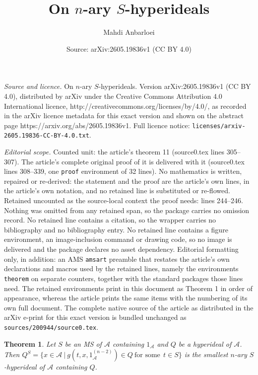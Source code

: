 \documentclass[10pt,a4paper]{amsart}
\title{On $n$-ary $S$-hyperideals}
\author{Mahdi Anbarloei}
\date{Source: arXiv:2605.19836v1 (CC BY 4.0)}
\newtheorem{theorem}{Theorem}
\begin{document}
\maketitle

\noindent\emph{Source and licence.} On $n$-ary $S$-hyperideals. Version arXiv:2605.19836v1 (CC BY 4.0), distributed by arXiv under the Creative Commons Attribution 4.0 International licence, http://creativecommons.org/licenses/by/4.0/, as recorded in the arXiv licence metadata for this exact version and shown on the abstract page https://arxiv.org/abs/2605.19836v1. Full licence notice: \texttt{licenses/arxiv-2605.19836-CC-BY-4.0.txt}.\par\smallskip

\noindent\textit{Editorial scope.} Counted unit: the article's theorem 11 (source0.tex lines 305--307). The article's complete original proof of it is delivered with it (source0.tex lines 308--339, one \texttt{proof} environment of 32 lines). No mathematics is written, repaired or re-derived: the statement and the proof are the article's own lines, in the article's own notation, and no retained line is substituted or re-flowed.  Retained uncounted as the source-local context the proof needs: lines 244--246.  Nothing was omitted from any retained span, so the package carries no omission record.  No retained line contains a citation, so the wrapper carries no bibliography and no bibliography entry.  No retained line contains a figure environment, an image-inclusion command or drawing code, so no image is delivered and the package declares no asset dependency.  Editorial formatting only, in addition: an AMS \texttt{amsart} preamble that restates the article's own declarations and macros used by the retained lines, namely the environments \texttt{theorem} on separate counters, together with the standard packages those lines need.  The retained environments print in this document as Theorem 1 in order of appearance, whereas the article prints the same items with the numbering of its own full document.  The complete native source of the article as distributed in the arXiv e-print for this exact version is bundled unchanged as \texttt{sources/200944/source0.tex}.
\begin{theorem} \label{4}
Let $S$ be an MS of $\mathscr{A}$ containing $1_\mathscr{A}$ and $Q$ be a hyperideal of $\mathscr{A}$. Then $Q^S=\{x \in \mathscr{A} \ \vert \ g(t,x,1_\mathscr{A}^{(n-2)}) \in Q\ \text{for some}  \ \ t \in S\}$   is the smallest $n$-ary $S$-hyperideal of $\mathscr{A}$ containing $Q$.
\end{theorem}
\end{document}
